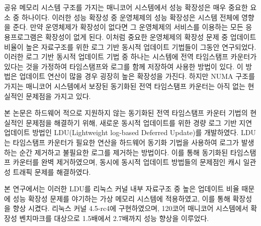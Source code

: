 \documentclass[doctor,korean,final]{kmu}
\begin{document}
\normalsize{
\hfill \break
\begin{center}
\\
\end{center}

\begin{center}
\\
\end{center}
\hfill \break

  공유 메모리 시스템 구조를 가지는 매니코어 시스템에서 성능 확장성은 매우 중요한 요소 중 하나이다.   
이러한 성능 확장성 중 운영체제의 성능 확장성은 시스템 전체에 영향을 준다. 
만약 운영체제가 확장성이 없다면 그 운영체제의 서비스를 이용하는 모든 응용프로그램은 확장성이 없게 된다.
이처럼 중요한 운영체제의 확장성 문제 중 업데이트 비율이 높은 자료구조를 위한 
로그 기반 동시적 업데이트 기법들이 그동안 연구되었다. 
이러한 로그 기반 동시적 업데이트 기법 중 하나는 
시스템에 전역 타임스탬프 카운터가 있다는 것을 가정하여 타임스탬프와 로그를 함께 저장하여 
사용한 방법이 있다. 
이 방법은 업데이트 연산이 많을 경우 굉장히 높은 확장성을 가진다. 
하지만 NUMA 구조를 가지는 매니코어 시스템에서 보장된 동기화된 
전역 타임스탬프 카운터는 아직 없는 현실적인 문제점을 가지고 있다.

본 논문은 하드웨어 적으로 지원하지 않는 동기화된 전역 타임스탬프 카운터 기법의 현실적인 문제점을 
해결하기 위해, 새로운 동시적 업데이트를 위한 경량 로그 기반 지연 업데이트 방법인 
LDU(Lightweight log-based Deferred Update)를 개발하였다.
LDU는 타임스탬프 카운터가 필요한 연산을 하드웨어 동기화 기법을 사용하여 
로그가 발생하는 순간 제거하고 불필요한 로그를 제거하는 방법이다. 
이를 통해 동기화된 타임스탬프 카운터를 완벽 제거하였으며, 동시에 동시적 업데이트 방법들의 문제점인
캐시 일관성 트래픽 문제를 해결하였다.

본 연구에서는 이러한 LDU를 리눅스 커널 내부 자료구조 중 높은 업데이트 비율 때문에 성능 확장성 
문제를 야기하는 가상 메모리 시스템에 적용하였고, 이를 통해 확장성을 향상 시켰다.
리눅스 커널 4.5-rc4에 구현하였으며, 120코어 매니코어 시스템에서 확장성 벤치마크를 대상으로 
1.5배에서 2.7배까지 성능 향상을 이루었다. 

}
\end{document}
